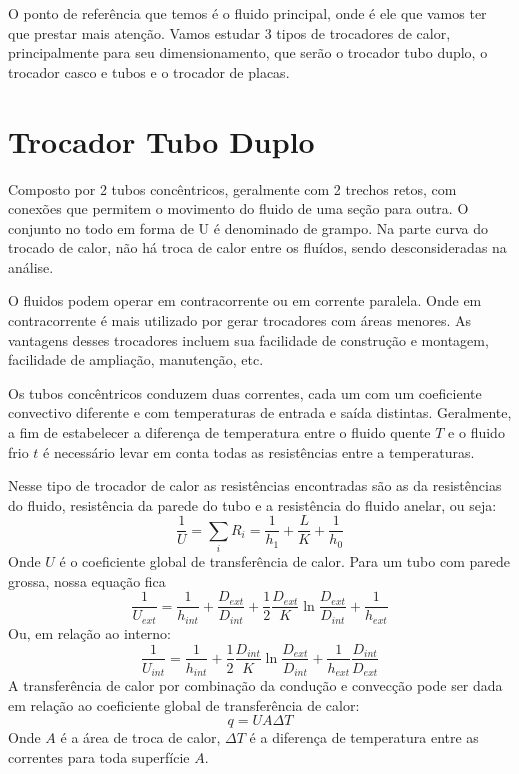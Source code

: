 O ponto de referência que temos é o fluido principal, onde é ele que vamos ter que prestar mais
atenção. Vamos estudar 3 tipos de trocadores de calor, principalmente para seu dimensionamento, que
serão o trocador tubo duplo, o trocador casco e tubos e o trocador de placas. \par

\section{Trocador Tubo Duplo}
Composto por 2 tubos concêntricos, geralmente com 2 trechos retos, com conexões que permitem o
movimento do fluido de uma seção para outra. O conjunto no todo em forma de U é denominado de
grampo. Na parte curva do trocado de calor, não há troca de calor entre os fluídos, sendo
desconsideradas na análise. \par

O fluidos podem operar em contracorrente ou em corrente paralela. Onde em contracorrente é mais
utilizado por gerar trocadores com áreas menores. As vantagens desses trocadores incluem sua
facilidade de construção e montagem, facilidade de ampliação, manutenção, etc. \par

Os tubos concêntricos conduzem duas correntes, cada um com um coeficiente convectivo diferente e com
temperaturas de entrada e saída distintas. Geralmente, a fim de estabelecer a diferença de
temperatura entre o fluido quente \(T\) e o fluido frio \(t\) é necessário levar em conta todas as
resistências entre a temperaturas. \par

Nesse tipo de trocador de calor as resistências encontradas são as da resistências do fluido,
resistência da parede do tubo e a resistência do fluido anelar, ou seja:
\begin{equation}\label{eq:resistencia_tubo_duplo_geral }
    \frac{1}{U} = \sum_{i} R_{i}  =\frac{1}{h_1} + \frac{L}{K} + \frac{1}{h_0}
\end{equation}
Onde \(U\) é o coeficiente global de transferência de calor. Para um tubo com parede grossa, nossa
equação fica
\begin{equation}\label{eq:resistencia_tubo_duplo_parede_grossa_externo }
    \frac{1}{U_{ext}} = \frac{1}{h_{int}} + \frac{D_{ext} }{D_{int}} + \frac{1}{2} \frac{D_{ext} }{K} \ln \frac{D_{ext} }{D_{int}} + \frac{1}{h_{ext}}
\end{equation}
Ou, em relação ao interno:
\begin{equation}\label{eq:resistencia_tubo_duplo_parede_grossa_interno }
    \frac{1}{U_{int}} = \frac{1}{h_{int}} + \frac{1}{2} \frac{D_{int}}{K} \ln \frac{D_{ext} }{D_{int}} + \frac{1}{h_{ext}}\frac{D_{int }}{D_{ext} }
\end{equation}
A transferência de calor por combinação da condução e convecção pode ser dada em relação ao
coeficiente global de transferência de calor:  
\begin{equation}\label{troca_de_calor_U}
    q = UA \Delta T
\end{equation}
Onde \(A\) é a área de troca de calor, \(\Delta T\) é a diferença de temperatura entre as correntes
para toda superfície \(A\). \par

